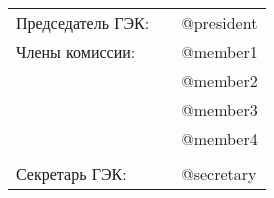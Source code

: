 \documentclass[a4paper,12pt]{article} %
\begin{document}
\begin{center} 	
	\begin{tabular}{lll}
		\vspace{0.3cm}
		\hspace{-3cm} Председатель ГЭК:\hspace{1cm} &\makebox[40mm]{\hrulefill} & @president  \\
	    \hspace{-3cm} Члены комиссии:  \hspace{1cm} &\makebox[40mm]{\hrulefill}\par\medskip & @member1 \\
		
						 \hspace{1cm} &\makebox[40mm]{\hrulefill}\par\medskip & @member2  \\
					   	 \hspace{1cm} &\makebox[40mm]{\hrulefill}\par\medskip & @member3  \\
						 \hspace{1cm} &\makebox[40mm]{\hrulefill}\par\medskip & @member4  \\ 
		 \vspace{-0.4cm}
		 \\			
	    \hspace{-3cm} Секретарь ГЭК:   \hspace{1cm} & \makebox[40mm]{\hrulefill}  & @secretary  \\		
	\end{tabular}
\end{center}
\end{document}
